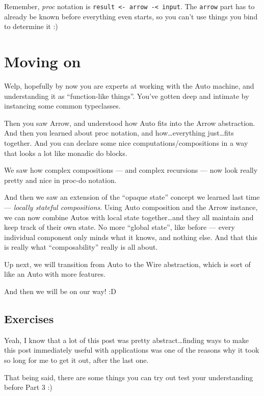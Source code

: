 \documentclass[]{article}
\begin{document}
Remember, \emph{proc} notation is
\texttt{result\ \textless{}-\ arrow\ -\textless{}\ input}. The
\texttt{arrow} part has to already be known before everything even
starts, so you can't use things you bind to determine it :)

\section{Moving on}\label{moving-on}

Welp, hopefully by now you are experts at working with the Auto machine,
and understanding it as ``function-like things''. You've gotten deep and
intimate by instancing some common typeclasses.

Then you saw Arrow, and understood how Auto fits into the Arrow
abstraction. And then you learned about proc notation, and
how\ldots{}everything just\ldots{}fits together. And you can declare
some nice computations/compositions in a way that looks a lot like
monadic do blocks.

We saw how complex compositions --- and complex recursions --- now look
really pretty and nice in proc-do notation.

And then we saw an extension of the ``opaque state'' concept we learned
last time --- \emph{locally stateful compositions}. Using Auto
composition and the Arrow instance, we can now combine Autos with local
state together\ldots{}and they all maintain and keep track of their own
state. No more ``global state'', like before --- every individual
component only minds what it knows, and nothing else. And that this is
really what ``composability'' really is all about.

Up next, we will transition from Auto to the Wire abstraction, which is
sort of like an Auto with more features.

And then we will be on our way! :D

\subsection{Exercises}\label{exercises}

Yeah, I know that a lot of this post was pretty abstract\ldots{}finding
ways to make this post immediately useful with applications was one of
the reasons why it took so long for me to get it out, after the last
one.

That being said, there are some things you can try out test your
understanding before Part 3 :)
\end{document}
